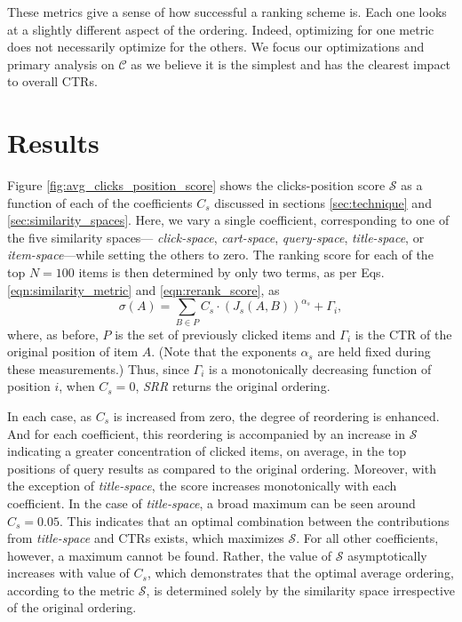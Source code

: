 \documentclass{article}
\begin{document}
These metrics give a sense of how successful a ranking scheme is. Each one looks at a slightly 
different aspect of the ordering. Indeed, optimizing for one metric does not necessarily 
optimize for the others. We focus our optimizations and primary analysis on $\mathscr{C}$
as we believe it is the simplest and has the clearest impact to overall CTRs.

\section{Results}

Figure \ref{fig:avg_clicks_position_score} shows the clicks-position score
$\mathscr{S}$ as a function of each of the coefficients $C_s$ discussed in
sections \ref{sec:technique} and \ref{sec:similarity_spaces}. Here, we vary a
single coefficient, corresponding to one of the five similarity spaces---{\em
click-space}, {\em cart-space}, {\em query-space}, {\em title-space}, or {\em
item-space}---while setting the others to zero. The ranking score for each of
the top $N=100$ items is then determined by only two terms, as per Eqs.
\ref{eqn:similarity_metric} and \ref{eqn:rerank_score}, as
\begin{equation}\label{eqn:single_coeff_score} 
    \sigma(A) = \sum_{B \in P}{C_s\cdot(J_s(A,B))^{\alpha_s}} + \Gamma_i, 
\end{equation}
where, as before, $P$ is the set of previously clicked items and $\Gamma_i$ is
the CTR of the original position of item $A$. (Note that the exponents
$\alpha_s$ are held fixed during these measurements.) Thus, since $\Gamma_i$ is
a monotonically decreasing function of position $i$, when $C_s = 0$, {\em SRR}
returns the original ordering.

In each case, as $C_s$ is increased from zero, the degree of reordering is
enhanced.  And for each coefficient, this reordering is accompanied by an
increase in $\mathscr{S}$ indicating a greater concentration of clicked items,
on average, in the top positions of query results as compared to the original
ordering.  Moreover, with the exception of {\em title-space}, the score
increases monotonically with each coefficient. In the case of {\em
title-space}, a broad maximum can be seen around $C_s = 0.05$. This indicates
that an optimal combination between the contributions from {\em title-space}
and CTRs exists, which maximizes $\mathscr{S}$. For all other coefficients,
however, a maximum cannot be found. Rather, the value of $\mathscr{S}$
asymptotically increases with value of $C_s$, which demonstrates that the
optimal average ordering, according to the metric $\mathscr{S}$, is determined
solely by the similarity space irrespective of the original ordering.
\end{document}
